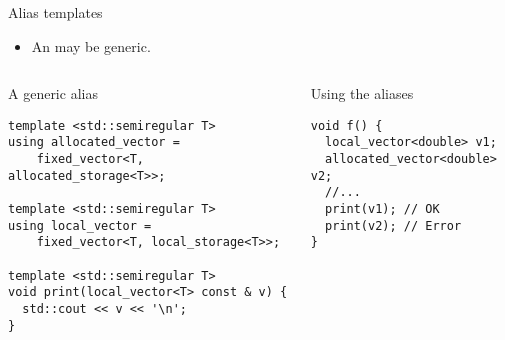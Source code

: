 \begin{frame}[t,fragile]{Alias templates}
\begin{itemize}
  \item An  may be generic.
\end{itemize}

\begin{columns}[T]

\begin{block}{A generic alias}
\begin{lstlisting}
template <std::semiregular T>
using allocated_vector = 
    fixed_vector<T, allocated_storage<T>>;

template <std::semiregular T>
using local_vector = 
    fixed_vector<T, local_storage<T>>;

template <std::semiregular T>
void print(local_vector<T> const & v) {
  std::cout << v << '\n';
}
\end{lstlisting}
\end{block}

\begin{block}{Using the aliases}
\begin{lstlisting}
void f() {
  local_vector<double> v1;
  allocated_vector<double> v2;
  //...
  print(v1); // OK
  print(v2); // Error
}
\end{lstlisting}
\end{block}

\end{columns}

\end{frame}
